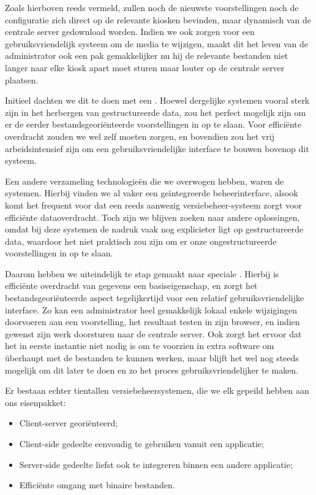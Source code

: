 Zoals hierboven reeds vermeld, zullen noch de nieuwste voorstellingen noch de configuratie zich direct op de relevante kiosken bevinden, maar dynamisch van de centrale server gedownload worden. Indien we ook zorgen voor een gebruiksvriendelijk systeem om de media te wijzigen, maakt dit het leven van de administrator ook een pak gemakkelijker nu hij de relevante bestanden niet langer naar elke kiosk apart moet sturen maar louter op de centrale server plaatsen.

Initieel dachten we dit te doen met een . Hoewel dergelijke systemen vooral sterk zijn in het herbergen van gestructureerde data, zou het perfect mogelijk zijn om er de eerder bestandsgeoriënteerde voorstellingen in op te slaan. Voor efficiënte overdracht zouden we wel zelf moeten zorgen, en bovendien zou het vrij arbeidsintensief zijn om een gebruiksvriendelijke interface te bouwen bovenop dit systeem.

Een andere verzameling technologieën die we overwogen hebben, waren de  systemen. Hierbij vinden we al vaker een geïntegreerde beheerinterface, alsook komt het frequent voor dat een reeds aanwezig versiebeheer-systeem zorgt voor efficiënte dataoverdracht. Toch zijn we blijven zoeken naar andere oplossingen, omdat bij deze systemen de nadruk vaak nog explicieter ligt op gestructureerde data, waardoor het niet praktisch zou zijn om er onze ongestructureerde voorstellingen in op te slaan.

Daarom hebben we uiteindelijk te stap gemaakt naar speciale . Hierbij is efficiënte overdracht van gegevens een basiseigenschap, en zorgt het bestandsgeoriënteerde aspect tegelijkertijd voor een relatief gebruiksvriendelijke interface. Zo kan een administrator heel gemakkelijk lokaal enkele wijzigingen doorvoeren aan een voorstelling, het resultaat testen in zijn browser, en indien gewenst zijn werk doorsturen naar de centrale server. Ook zorgt het ervoor dat het in eerste instantie niet nodig is om te voorzien in extra software om überhaupt met de bestanden te kunnen werken, maar blijft het wel nog steeds mogelijk om dit later te doen en zo het proces gebruiksvriendelijker te maken.

Er bestaan echter tientallen versiebeheersystemen, die we elk gepeild hebben aan ons eisenpakket:
\begin{itemize}
\item Client-server georiënteerd;
\item Client-side gedeelte eenvoudig te gebruiken vanuit een applicatie;
\item Server-side gedeelte liefst ook te integreren binnen een andere applicatie;
\item Efficiënte omgang met binaire bestanden.
\end{itemize}

